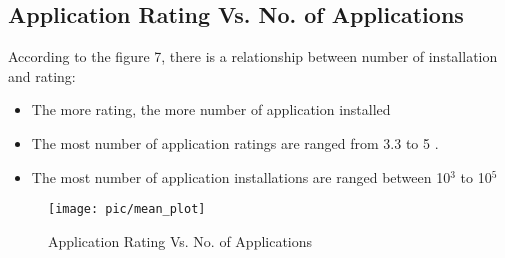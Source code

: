 \subsection*{Application Rating Vs. No. of Applications }
According to the figure 7, there is a relationship between number of installation and rating:
\begin{itemize}
\item The more rating, the more number of application installed\\
\item The most number of application ratings are ranged from 3.3 to 5 .\\
\item The most number of application installations are ranged between 10$^{3}$  to 10$^{5}$\\
\end{itemize}
\begin{figure}
\centering
\texttt{[image: pic/mean\_plot]}
\caption{Application Rating Vs. No. of Applications} 
\label{fig:7}
\end{figure}



